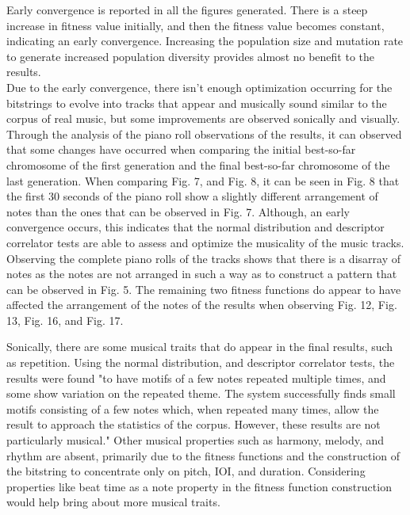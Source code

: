 \documentclass[conference]{IEEEtran}
\begin{document}
Early convergence is reported in all the figures generated. There is a steep increase in fitness value initially, and then the fitness value becomes constant, indicating an early convergence. Increasing the population size and mutation rate to generate increased population diversity provides almost no benefit to the results. 
\\
Due to the early convergence, there isn't enough optimization occurring for the bitstrings to evolve into tracks that appear and musically sound similar to the corpus of real music, but some improvements are observed sonically and visually. Through the analysis of the piano roll observations of the results, it can observed that some changes have occurred when comparing the initial best-so-far chromosome of the first generation and the final best-so-far chromosome of the last generation. When comparing Fig. 7, and Fig. 8, it can be seen in Fig. 8 that the first 30 seconds of the piano roll show a slightly different arrangement of notes than the ones that can be observed in Fig. 7.  Although, an early convergence occurs, this indicates that the normal distribution and descriptor correlator tests are able to assess and optimize the musicality of the music tracks. Observing the complete piano rolls of the tracks shows that there is a disarray of notes as the notes are not arranged in such a way as to construct a pattern that can be observed in Fig. 5. The remaining two fitness functions do appear to have affected the arrangement of the notes of the results when observing Fig. 12, Fig. 13, Fig. 16, and Fig. 17.

Sonically, there are some musical traits that do appear in the final results, such as repetition. Using the normal distribution, and descriptor correlator tests, the results were found "to have motifs of a few notes repeated multiple times, and some show variation on the repeated theme. The system successfully finds small motifs consisting of a few notes which, when repeated many times, allow the result to approach the statistics of the corpus. However, these results are not particularly musical." \cite{b1} Other musical properties such as harmony, melody, and rhythm are absent, primarily due to the fitness functions and the construction of the bitstring to concentrate only on pitch, IOI, and duration. Considering properties like beat time as a note property in the fitness function construction would help bring about more musical traits. 
\end{document}
